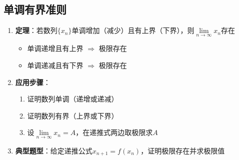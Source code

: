 \documentclass[../book.tex]{subfiles}
\begin{document}
    \subsection{单调有界准则}

    \begin{enumerate}
        \item \textbf{定理}：若数列$\{x_n\}$单调增加（减少）且有上界（下界），则$\lim\limits_{n\to\infty} x_n$存在
        \begin{itemize}
            \item 单调递增且有上界 $\Rightarrow$ 极限存在
            \item 单调递减且有下界 $\Rightarrow$ 极限存在
        \end{itemize}

        \item \textbf{应用步骤}：
        \begin{enumerate}
            \item 证明数列单调（递增或递减）
            \item 证明数列有界（上界或下界）
            \item 设$\lim\limits_{n\to\infty} x_n = A$，在递推式两边取极限求$A$
        \end{enumerate}

        \item \textbf{典型题型}：给定递推公式$x_{n+1} = f(x_n)$，证明极限存在并求极限值
    \end{enumerate}
\end{document}
